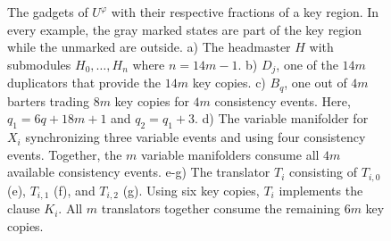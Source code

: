 \documentclass[english]{lipics_hacked}
\begin{document}
\begin{figure}[h!]
\caption{
The gadgets of $U^\varphi$ with their respective fractions of a key region.
In every example, the gray marked states are part of the key region while the unmarked are outside.
a) The headmaster $H$ with submodules $H_0, \dots, H_n$ where $n = 14m-1$.
b) $D_j$, one of the $14m$ duplicators that provide the $14m$ key copies.
c) $B_q$, one out of $4m$ barters trading $8m$ key copies for $4m$ consistency events.
Here, $q_1 = 6q + 18m +1$ and $q_2 = q_1 + 3$.
d) The variable manifolder for $X_i$ synchronizing three variable events and using four consistency events.
Together, the $m$ variable manifolders consume all $4m$ available consistency events.
e-g) The translator $T_i$ consisting of $T_{i,0}$ (e), $T_{i,1}$ (f), and $T_{i,2}$ (g).
Using six key copies, $T_i$ implements the clause $K_i$.
All $m$ translators together consume the remaining $6m$ key copies.
}
\label{fig:gadgets}
\end{figure}
\end{document}
